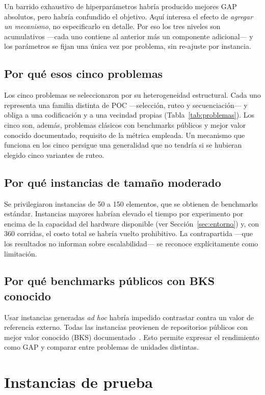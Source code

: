 Un barrido exhaustivo de hiperparámetros habría producido mejores GAP
absolutos, pero habría confundido el objetivo. Aquí interesa el efecto de
\emph{agregar un mecanismo}, no especificarlo en detalle. Por eso los tres
niveles son acumulativos —cada uno contiene al anterior más un componente
adicional— y los parámetros se fijan una única vez por problema, sin
re-ajuste por instancia.

\subsection{Por qué esos cinco problemas}

Los cinco problemas se seleccionaron por su heterogeneidad estructural. Cada
uno representa una familia distinta de POC —selección, ruteo y
secuenciación— y obliga a una codificación y a una vecindad propias
(Tabla~\ref{tab:problemas}). Los cinco son, además, problemas clásicos con
benchmarks públicos y mejor valor conocido documentado, requisito de la
métrica empleada. Un mecanismo que funciona en los cinco persigue una
generalidad que no tendría si se hubieran elegido cinco variantes de ruteo.

\subsection{Por qué instancias de tamaño moderado}

Se privilegiaron instancias de 50 a 150 elementos, que se obtienen de
benchmarks estándar. Instancias mayores habrían elevado el tiempo por
experimento por encima de la capacidad del hardware disponible (ver
Sección~\ref{sec:entorno}) y, con 360 corridas, el costo total se habría
vuelto prohibitivo. La contrapartida —que los resultados no informan sobre
escalabilidad— se reconoce explícitamente como limitación.

\subsection{Por qué benchmarks públicos con BKS conocido}

Usar instancias generadas \emph{ad hoc} habría impedido contrastar contra un valor
de referencia externo. Todas las instancias provienen de repositorios
públicos con mejor valor conocido (BKS) documentado~\cite{reinelt1991tsplib,
taillard1993benchmarks,christofides1979vehicle}. Esto permite expresar
el rendimiento como GAP y comparar entre problemas de unidades distintas.

\section{Instancias de prueba}

